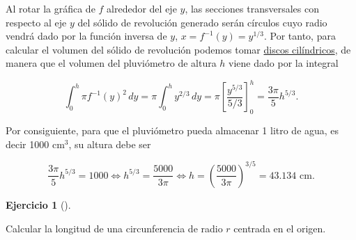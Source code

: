 \documentclass[
  spanish,
  a4paper,
]{scrreport}
\theoremstyle{definition}
\newtheorem{exercise}{Ejercicio}[chapter]
\theoremstyle{remark}
\begin{document}
\begin{tcolorbox}[enhanced jigsaw, arc=.35mm, bottomrule=.15mm, bottomtitle=1mm, breakable, colback=white, colbacktitle=quarto-callout-tip-color!10!white, colframe=quarto-callout-tip-color-frame, coltitle=black, left=2mm, leftrule=.75mm, opacityback=0, opacitybacktitle=0.6, rightrule=.15mm, title=\textcolor{quarto-callout-tip-color}{\faLightbulb}\hspace{0.5em}{Solución}, titlerule=0mm, toprule=.15mm, toptitle=1mm]

Al rotar la gráfica de \(f\) alrededor del eje \(y\), las secciones
transversales con respecto al eje \(y\) del sólido de revolución
generado serán círculos cuyo radio vendrá dado por la función inversa de
\(y\), \(x = f^{-1}(y) = y^{1/3}\). Por tanto, para calcular el volumen
del sólido de revolución podemos tomar
\href{https://aprendeconalf.es/analisis-manual/08-integraleshtml\#c\%C3\%A1lculo-de-vol\%C3\%BAmenes-de-s\%C3\%B3lidos-de-revoluci\%C3\%B3n}{discos
cilíndricos}, de manera que el volumen del pluviómetro de altura \(h\)
viene dado por la integral

\[
\int_0^h \pi f^{-1}(y)^2\,dy
= \pi \int_0^h y^{2/3}\,dy
= \pi \left[\frac{y^{5/3}}{5/3}\right]_0^h
= \frac{3\pi}{5}h^{5/3}.
\]

Por consiguiente, para que el pluviómetro pueda almacenar 1 litro de
agua, es decir 1000 cm\(^3\), su altura debe ser

\[
\frac{3\pi}{5}h^{5/3} = 1000 
\Leftrightarrow h^{5/3} = \frac{5000}{3\pi} 
\Leftrightarrow h = \left(\frac{5000}{3\pi}\right)^{3/5} = 43.134 \mbox{ cm}.
\]

\end{tcolorbox}

\begin{exercise}[]\protect\hypertarget{exr-longitud-circunferencia}{}\label{exr-longitud-circunferencia}

Calcular la longitud de una circunferencia de radio \(r\) centrada en el
origen.

\end{exercise}
\end{document}
